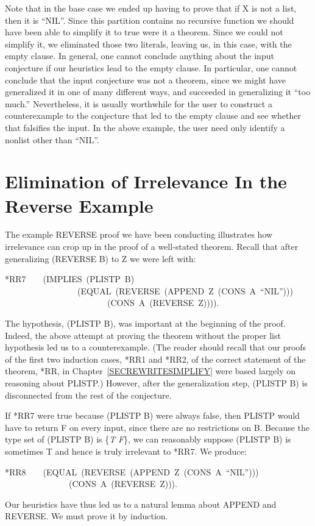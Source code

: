 \documentclass[11pt]{book}
\newenvironment{pubasis}{\begin{flushleft}\ttfamily\small}{\normalsize\rmfamily\end{flushleft}}
\newcommand{\pubinlineunderline}[1]{\emph{#1}}
\newcommand{\pubdefaulttextsize}{\large}
\begin{document}
Note that in the base case we ended up having to prove that
if X is not a list, then it is ``NIL''.  Since this partition contains no recursive
function we should have been able to simplify it to true were it a theorem.
Since we could not simplify it, we eliminated those two literals,
leaving us, in this case, with the empty clause.
In general, one cannot conclude anything about the input conjecture
if our heuristics lead to the empty clause.  In particular, one cannot
conclude that the input conjecture was not a theorem, since we might have
generalized it in one of many different ways, and succeeded in generalizing
it ``too much.''  Nevertheless, it is usually worthwhile for the user to 
construct a counterexample to the conjecture that led to the empty clause
and see whether that falsifies the input.  In the above example,
the user need only identify a nonlist other than ``NIL''.
\section{Elimination of Irrelevance In the Reverse Example}
\pubdefaulttextsize
The example REVERSE proof we have been conducting illustrates
how irrelevance can crop up in the proof of a well-stated theorem.
Recall that after generalizing (REVERSE B) to Z we were left with:
\begin{pubasis}
*RR7~~~~(IMPLIES~(PLISTP~B)\\
~~~~~~~~~~~~~~~~~(EQUAL~(REVERSE~(APPEND~Z~(CONS~A~``NIL'')))\\
~~~~~~~~~~~~~~~~~~~~~~~~(CONS~A~(REVERSE~Z)))).\\
\end{pubasis}
The hypothesis, (PLISTP B), was important at the beginning of the
proof.  Indeed, the above attempt at proving the theorem
without the proper list hypothesis led us to a counterexample.
(The reader should recall that our proofs of the first
two induction cases,
*RR1 and *RR2, of the correct statement of the theorem, *RR, 
in Chapter~\ref{SECREWRITESIMPLIFY}
were based largely
on reasoning about PLISTP.)  However, after the generalization
step, (PLISTP B) is disconnected from the rest of the conjecture.

If *RR7 were true because (PLISTP B) were always false, then PLISTP
would have to return F on every input, since there are no restrictions on B.
Because the type set of (PLISTP B) is \{\pubinlineunderline{T} \pubinlineunderline{F}\},
we can reasonably suppose (PLISTP B) is sometimes T
and hence is truly irrelevant to *RR7.  We produce:
\begin{pubasis}
*RR8~~~~(EQUAL~(REVERSE~(APPEND~Z~(CONS~A~``NIL'')))\\
~~~~~~~~~~~~~~~(CONS~A~(REVERSE~Z))).\\
\end{pubasis}
Our heuristics have thus led us to 
a natural lemma about APPEND and REVERSE.  We must
prove it by induction.
\end{document}

